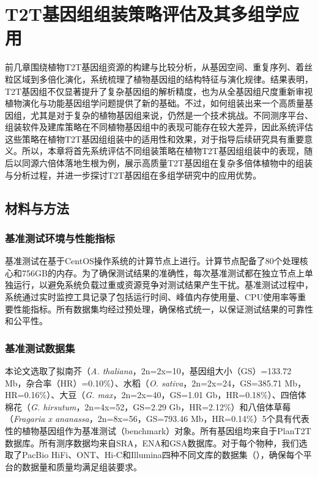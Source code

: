 \chapter{T2T基因组组装策略评估及其多组学应用}

前几章围绕植物T2T基因组资源的构建与比较分析，从基因空间、重复序列、着丝粒区域到多倍化演化，系统梳理了植物基因组的结构特征与演化规律。结果表明，T2T基因组不仅显著提升了复杂基因组的解析精度，也为从全基因组尺度重新审视植物演化与功能基因组学问题提供了新的基础。不过，如何组装出来一个高质量基因组，尤其是对于复杂的植物基因组来说，仍然是一个技术挑战。不同测序平台、组装软件及建库策略在不同植物基因组中的表现可能存在较大差异，因此系统评估这些策略在植物T2T基因组组装中的适用性和效果，对于指导后续研究具有重要意义。所以，本章将首先系统评估不同组装策略在植物T2T基因组组装中的表现，随后以同源六倍体落地生根为例，展示高质量T2T基因组在复杂多倍体植物中的组装与分析过程，并进一步探讨T2T基因组在多组学研究中的应用优势。

\section{材料与方法}
\subsection{基准测试环境与性能指标}
基准测试在基于CentOS操作系统的计算节点上进行。计算节点配备了80个处理核心和756GB的内存。为了确保测试结果的准确性，每次基准测试都在独立节点上单独运行，以避免系统负载过重或资源竞争对测试结果产生干扰。基准测试过程中，系统通过实时监控工具记录了包括运行时间、峰值内存使用量、CPU使用率等重要性能指标。所有数据集均经过预处理，确保格式统一，以保证测试结果的可靠性和公平性。

\subsection{基准测试数据集}
本论文选取了拟南芥（\textit{A. thaliana}，2n=2x=10，基因组大小（GS）=133.72 Mb，杂合率（HR）=0.10\%）、水稻（\textit{O. sativa}，2n=2x=24，GS=385.71 Mb，HR=0.16\%）、大豆（\textit{G. max}，2n=2x=40，GS=1.01 Gb，HR=0.18\%）、四倍体棉花（\textit{G. hirsutum}，2n=4x=52，GS=2.29 Gb，HR=2.12\%）和八倍体草莓（\textit{Fragaria x ananassa}，2n=8x=56，GS=793.46 Mb，HR=0.14\%）5个具有代表性的植物基因组作为基准测试（benchmark）对象。所有基因组均来自于PlanT2T数据库。所有测序数据均来自SRA，ENA和GSA数据库。对于每个物种，我们选取了PacBio HiFi、ONT、Hi-C和Illumina四种不同文库的数据集（），确保每个平台的数据量和质量均满足组装要求。

